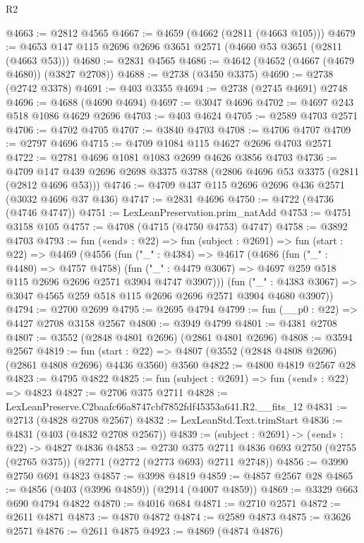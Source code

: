 \begin{lexlean}{R2}
\begin{coremodule}
@4663 := @2812 @4565
@4667 := @4659 (@4662 (@2811 (@4663 @105)))
@4679 := @4653 @147 @115 @2696 @2696 @3651 @2571 (@4660 @53 @3651 (@2811 (@4663 @53)))
@4680 := @2831 @4565
@4686 := @4642 (@4652 (@4667 (@4679 @4680)) (@3827 @2708))
@4688 := @2738 (@3450 @3375)
@4690 := @2738 (@2742 @3378)
@4691 := @403 @3355
@4694 := @2738 (@2745 @4691) @2748
@4696 := @4688 (@4690 @4694)
@4697 := @3047 @4696
@4702 := @4697 @243 @518 @1086 @4629 @2696
@4703 := @403 @4624
@4705 := @2589 @4703 @2571
@4706 := @4702 @4705
@4707 := @3840 @4703
@4708 := @4706 @4707
@4709 := @2797 @4696
@4715 := @4709 @1084 @115 @4627 @2696 @4703 @2571
@4722 := @2781 @4696 @1081 @1083 @2699 @4626 @3856 @4703
@4736 := @4709 @147 @439 @2696 @2698 @3375 @3788 (@2806 @4696 @53 @3375 (@2811 (@2812 @4696 @53)))
@4746 := @4709 @437 @115 @2696 @2696 @436 @2571 (@3032 @4696 @37 @436)
@4747 := @2831 @4696
@4750 := @4722 (@4736 (@4746 @4747))
@4751 := LexLeanPreservation.prim_natAdd
@4753 := @4751 @3158 @105
@4757 := @4708 (@4715 (@4750 @4753) @4747)
@4758 := @3892 @4703
@4793 := fun («end» : @22) =>
  fun (subject : @2691) =>
  fun (start : @22) =>
  @4469
    (@4556
      (fun ("_" : @4384) =>
      @4617
        (@4686
          (fun ("_" : @4480) => @4757 @4758)
          (fun ("_" : @4479 @3067) => @4697 @259 @518 @115 @2696 @2696 @2571 @3904 @4747 @3907)))
      (fun ("_" : @4383 @3067) => @3047 @4565 @259 @518 @115 @2696 @2696 @2571 @3904 @4680 @3907))
@4794 := @2700 @2699
@4795 := @2695 @4794
@4799 := fun (__p0 : @22) => @4427 @2708 @3158 @2567
@4800 := @3949 @4799
@4801 := @4381 @2708
@4807 := @3552 (@2848 @4801 @2696) (@2861 @4801 @2696)
@4808 := @3594 @2567
@4819 := fun (start : @22) =>
  @4807 (@3552 (@2848 @4808 @2696) (@2861 @4808 @2696) @4436 @3560) @3560
@4822 := @4800 @4819 @2567 @28
@4823 := @4795 @4822
@4825 := fun (subject : @2691) => fun («end» : @22) => @4823
@4827 := @2706 @375 @2711
@4828 := LexLeanPreserve.C2baafc66a8747cbf7852fdf45353a641.R2.__fits_12
@4831 := @2713 (@4828 @2708 @2567)
@4832 := LexLeanStd.Text.trimStart
@4836 := @4831 (@403 (@4832 @2708 @2567))
@4839 := (subject : @2691) -> («end» : @22) -> @4827 @4836
@4853 := @2730
    @375
    @2711
    @4836
    @693
    @2750
    (@2755 (@2765 @375))
    (@2771 (@2772 (@2773 @693) @2711 @2748))
@4856 := @3990 @2750 @691 @4823
@4857 := @3998 @4819
@4859 := @4857 @2567 @28
@4865 := @4856 (@403 (@3996 @4859)) (@2914 (@4007 @4859))
@4869 := @3329 @663 @690 @4794 @4822
@4870 := @4016 @684
@4871 := @2710 @2571
@4872 := @2611 @4871
@4873 := @4870 @4872
@4874 := @2589 @4873
@4875 := @3626 @2571
@4876 := @2611 @4875
@4923 := @4869
    (@4874 @4876)

\end{coremodule}
\end{lexlean}
